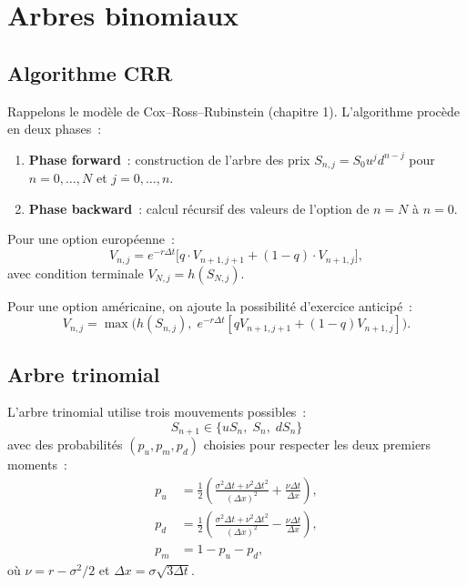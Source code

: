 \section{Arbres binomiaux}

\subsection{Algorithme CRR}

Rappelons le mod\`ele de Cox--Ross--Rubinstein (chapitre 1). L'algorithme
proc\`ede en deux phases~:
\begin{enumerate}
    \item \textbf{Phase forward}~: construction de l'arbre des prix
          $S_{n,j} = S_0 u^j d^{n-j}$ pour $n = 0, \ldots, N$ et
          $j = 0, \ldots, n$.
    \item \textbf{Phase backward}~: calcul r\'ecursif des valeurs de
          l'option de $n = N$ \`a $n = 0$.
\end{enumerate}

\begin{formules}[title=\textbf{R\'ecurrence backward}]
Pour une option europ\'eenne~:
\[
    V_{n,j} = e^{-r\Delta t}\bigl[q \cdot V_{n+1,j+1}
              + (1-q) \cdot V_{n+1,j}\bigr],
\]
avec condition terminale $V_{N,j} = h(S_{N,j})$.

Pour une option am\'ericaine, on ajoute la possibilit\'e d'exercice
anticip\'e~:
\[
    V_{n,j} = \max\!\bigl(h(S_{n,j}),\;
              e^{-r\Delta t}[q V_{n+1,j+1} + (1-q) V_{n+1,j}]\bigr).
\]
\end{formules}

\subsection{Arbre trinomial}

\begin{definition}
L'arbre trinomial utilise trois mouvements possibles~:
\[
    S_{n+1} \in \{u S_n,\; S_n,\; d S_n\}
\]
avec des probabilit\'es $(p_u, p_m, p_d)$ choisies pour respecter
les deux premiers moments~:
\begin{align}
    p_u &= \frac{1}{2}\left(\frac{\sigma^2\Delta t + \nu^2\Delta t^2}
           {(\Delta x)^2} + \frac{\nu\Delta t}{\Delta x}\right), \\
    p_d &= \frac{1}{2}\left(\frac{\sigma^2\Delta t + \nu^2\Delta t^2}
           {(\Delta x)^2} - \frac{\nu\Delta t}{\Delta x}\right), \\
    p_m &= 1 - p_u - p_d,
\end{align}
o\`u $\nu = r - \sigma^2/2$ et $\Delta x = \sigma\sqrt{3\Delta t}$.
\end{definition}

